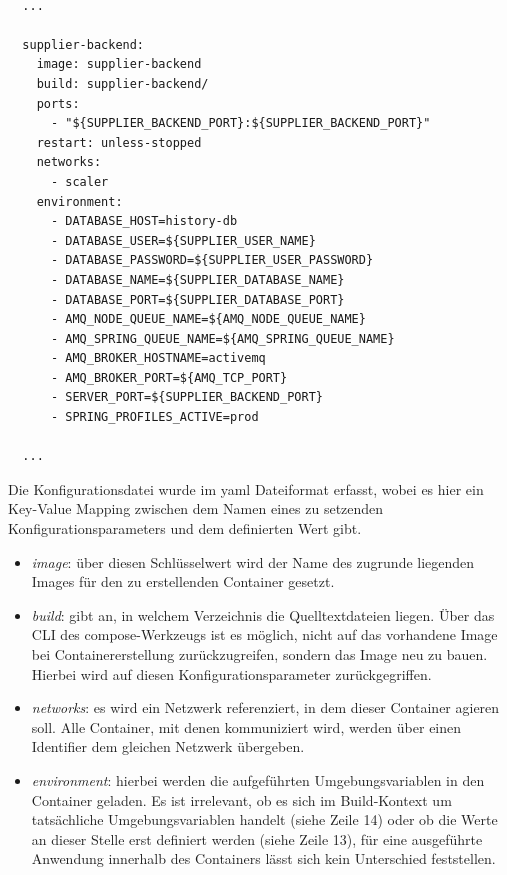 \begin{minipage}{\linewidth}
\begin{lstlisting}[style=bashStyle,caption={Docker Compose - Ausschnitt Supplier Definition},label=lst:dockerCompose]

  ...

  supplier-backend:
    image: supplier-backend
    build: supplier-backend/
    ports:
      - "${SUPPLIER_BACKEND_PORT}:${SUPPLIER_BACKEND_PORT}"
    restart: unless-stopped
    networks:
      - scaler
    environment:
      - DATABASE_HOST=history-db
      - DATABASE_USER=${SUPPLIER_USER_NAME}
      - DATABASE_PASSWORD=${SUPPLIER_USER_PASSWORD}
      - DATABASE_NAME=${SUPPLIER_DATABASE_NAME}
      - DATABASE_PORT=${SUPPLIER_DATABASE_PORT}
      - AMQ_NODE_QUEUE_NAME=${AMQ_NODE_QUEUE_NAME}
      - AMQ_SPRING_QUEUE_NAME=${AMQ_SPRING_QUEUE_NAME}
      - AMQ_BROKER_HOSTNAME=activemq
      - AMQ_BROKER_PORT=${AMQ_TCP_PORT}
      - SERVER_PORT=${SUPPLIER_BACKEND_PORT}
      - SPRING_PROFILES_ACTIVE=prod
  
  ...

\end{lstlisting}
\end{minipage}

Die Konfigurationsdatei wurde im yaml Dateiformat erfasst, wobei es hier ein Key-Value Mapping zwischen dem Namen eines zu setzenden Konfigurationsparameters und dem definierten Wert gibt.

\begin{itemize}
  \item \emph{image}: über diesen Schlüsselwert wird der Name des zugrunde liegenden Images für den zu erstellenden Container gesetzt.
  \item \emph{build}: gibt an, in welchem Verzeichnis die Quelltextdateien liegen. Über das CLI des compose-Werkzeugs ist es möglich, nicht auf das vorhandene Image bei Containererstellung zurückzugreifen, sondern das Image neu zu bauen. Hierbei wird auf diesen Konfigurationsparameter zurückgegriffen.
  \item \emph{networks}: es wird ein Netzwerk referenziert, in dem dieser Container agieren soll. Alle Container, mit denen kommuniziert wird, werden über einen Identifier dem gleichen Netzwerk übergeben. 
  \item \emph{environment}: hierbei werden die aufgeführten Umgebungsvariablen in den Container geladen. Es ist irrelevant, ob es sich im Build-Kontext um tatsächliche Umgebungsvariablen handelt (siehe Zeile 14) oder ob die Werte an dieser Stelle erst definiert werden (siehe Zeile 13), für eine ausgeführte Anwendung innerhalb des Containers lässt sich kein Unterschied feststellen.
\end{itemize}

